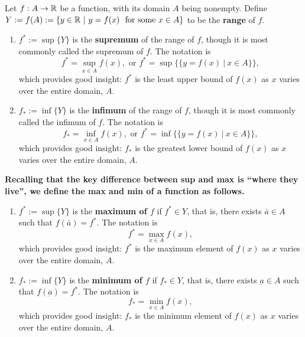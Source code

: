 \bigskip

\begin{tcolorbox}[colback=mylightblue, title = {\bf Extremal Values of a Function (or a Function's Range)}, breakable]
\begin{definition}
\label{def:SupInftFunctions}
Let $f:A \to \mathbb R$ be a function, with its domain $A$ being nonempty. Define $Y:=f(A):=\{y \in \mathbb R ~| ~ y=f(x)~~\text{for some } x \in A\}$ to be the \textbf{range} of $f$.

\begin{enumerate}
\renewcommand{\labelenumi}{(\alph{enumi})}
\setlength{\itemsep}{.2cm}
    \item  $f^\ast:= \sup\{Y\}$ is the \textbf{supremum} of the range of $f$, though it is most commonly called the supremum of $f$. The notation is
    $$f^\ast = \sup_{x\in A} f(x), \text{ or } f^\ast =\sup \big\{ \{ y=f(x) ~| ~ x \in A\}  \big\},$$
    which provides good insight: $f^\ast$ is the least upper bound of $f(x)$ as $x$ varies over the entire domain, $A$.

    \item   $f_\ast:= \inf\{Y\}$ is the \textbf{infimum} of the range of $f$, though it is most commonly called the infimum of $f$. The notation is
    $$f_\ast = \inf_{x\in A} f(x), \text{ or } f^\ast =\inf \big\{ \{ y=f(x) ~| ~ x \in A\}  \big\},$$
    which provides good insight: $f_\ast$ is the greatest lower bound of $f(x)$ as $x$ varies over the entire domain, $A$.
\end{enumerate}

\textbf{Recalling that the key difference between sup and max is ``where they live'', we define the max and min of a function as follows.}

\begin{enumerate}
\renewcommand{\labelenumi}{(\alph{enumi})}
\setlength{\itemsep}{.2cm}
\setcounter{enumi}{2} 
    \item  $f^\ast:= \sup\{Y\}$ is the \textbf{maximum of $f$} if $f^\ast \in Y$, that is, there exists $\bar{a} \in A$ such that $f(\bar{a}) = f^\ast$. The notation is
    $$f^\ast = \max_{x\in A} f(x),$$
    which provides good insight: $f^\ast$ is the maximum element of $f(x)$ as $x$ varies over the entire domain, $A$.

    \item  $f_\ast:= \inf\{Y\}$ is the \textbf{minimum of $f$} if $f_\ast \in Y$, that is, there exists $\underbar{a} \in A$ such that $f(\underbar{a}) = f^\ast$. The notation is
    $$f_\ast = \min_{x\in A} f(x),$$
    which provides good insight: $f_\ast$ is the minimum element of $f(x)$ as $x$ varies over the entire domain, $A$.
\end{enumerate}


\end{definition}
\end{tcolorbox}
